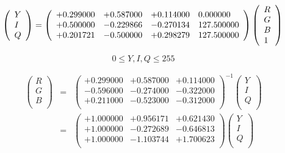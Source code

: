 \documentclass{article}
\begin{document}
\[ \left( \begin{array}{l} Y \\ I \\ Q \\ \end{array} \right) = \left( \begin{array}{llll} +0.299000 & +0.587000 & +0.114000 & 0.000000 \\ +0.500000 & -0.229866 & -0.270134 & 127.500000 \\ +0.201721 & -0.500000 & +0.298279 & 127.500000 \\ \end{array} \right) \left( \begin{array}{l} R \\ G \\ B \\ 1 \\ \end{array} \right) \\ \]
\pagebreak

\[ 0 \le Y, I, Q \le 255 \]
\pagebreak

\begin{eqnarray*} \left( \begin{array}{l} R \\ G \\ B \\ \end{array} \right) &=& \left( \begin{array}{lll} +0.299000 & +0.587000 & +0.114000 \\ -0.596000 & -0.274000 & -0.322000 \\ +0.211000 & -0.523000 & -0.312000 \\ \end{array} \right)^{-1} \left( \begin{array}{l} Y \\ I \\ Q \\ \end{array} \right) \\ &=& \left( \begin{array}{lll} +1.000000 & +0.956171 & +0.621430 \\ +1.000000 & -0.272689 & -0.646813 \\ +1.000000 & -1.103744 & +1.700623 \\ \end{array} \right) \left( \begin{array}{l} Y \\ I \\ Q \\ \end{array} \right) \\ \end{eqnarray*}
\pagebreak
\end{document}
